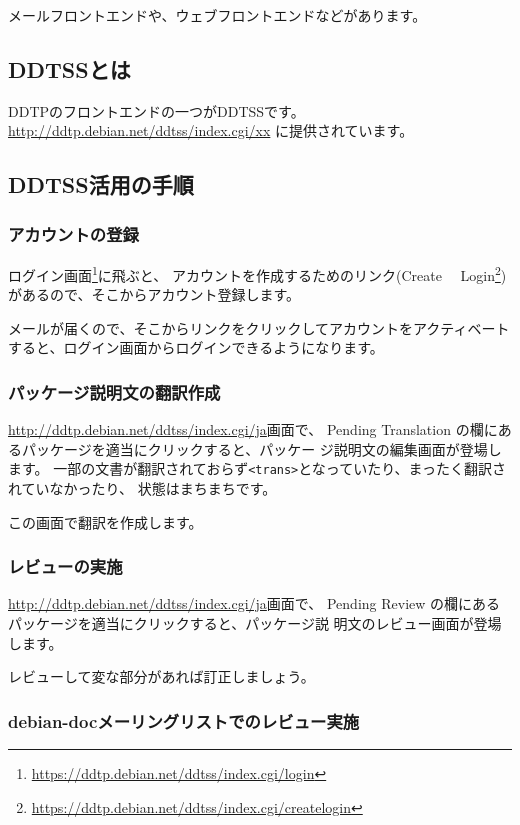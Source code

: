 \documentclass[mingoth,a4paper]{jsarticle}
\begin{document}
\begin{commandline}
メールフロントエンドや、ウェブフロントエンドなどがあります。

\subsection{DDTSSとは}

DDTPのフロントエンドの一つがDDTSSです。
\url{http://ddtp.debian.net/ddtss/index.cgi/xx}
に提供されています。

\subsection{DDTSS活用の手順}

\subsubsection{アカウントの登録}

ログイン画面\footnote{\url{https://ddtp.debian.net/ddtss/index.cgi/login}}に飛ぶと、
アカウントを作成するためのリンク(Create　
Login\footnote{\url{https://ddtp.debian.net/ddtss/index.cgi/createlogin}})
があるので、そこからアカウント登録します。

メールが届くので、そこからリンクをクリックしてアカウントをアクティベート
すると、ログイン画面からログインできるようになります。

\subsubsection{パッケージ説明文の翻訳作成}

\url{http://ddtp.debian.net/ddtss/index.cgi/ja}画面で、
Pending Translation の欄にあるパッケージを適当にクリックすると、パッケー
ジ説明文の編集画面が登場します。
一部の文書が翻訳されておらず\verb!<trans>!となっていたり、まったく翻訳さ
れていなかったり、
状態はまちまちです。

この画面で翻訳を作成します。

\subsubsection{レビューの実施}

\url{http://ddtp.debian.net/ddtss/index.cgi/ja}画面で、
Pending Review の欄にあるパッケージを適当にクリックすると、パッケージ説
明文のレビュー画面が登場します。

レビューして変な部分があれば訂正しましょう。

\subsubsection{debian-docメーリングリストでのレビュー実施}


\end{commandline}
\end{document}
